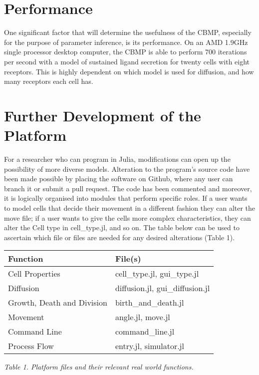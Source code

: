 \documentclass[11.5pt]{article}
\begin{document}
\section{Performance}

One significant factor that will determine the usefulness of the CBMP, 
especially for the purpose of parameter inference, is its performance. 
On an AMD 1.9GHz single processor desktop computer, the CBMP is able to 
perform 700 iterations per second with a model of sustained ligand 
secretion for twenty cells with eight receptors. This is highly 
dependent on which model is used for diffusion, and how many receptors 
each cell has.

\section{Further Development of the Platform}
For a researcher who can program in Julia, modifications can open up the 
possibility of more diverse models. Alteration to the program's source 
code have been made possible by placing the software on Github, where 
any user can branch it or submit a pull request. The code has been 
commented and moreover, it is logically organised into modules that 
perform specific roles. If a user wants to model cells that decide their 
movement in a different fashion they can alter the move file; if a user 
wants to give the cells more complex characteristics, they can alter the 
Cell type in cell\_type.jl, and so on. The table below can be used to 
ascertain which file or files are needed for any desired alterations 
(Table 1).

\begin{table}[H]
\centering
\begin{tabular}{ll}
\hline
{\bfseries Function} & {\bfseries File(s)} \\
\hline
Cell Properties & cell\_type.jl, gui\_type.jl \\
\hline
Diffusion & diffusion.jl, gui\_diffusion.jl \\
\hline
Growth, Death and Division & birth\_and\_death.jl \\
\hline
Movement & angle.jl, move.jl \\
\hline
Command Line & command\_line.jl \\
\hline
Process Flow & entry.jl, simulator.jl \\
\hline
\end{tabular}
\end{table}
{\itshape Table 1. Platform files and their relevant real world 
functions.}
\end{document}
